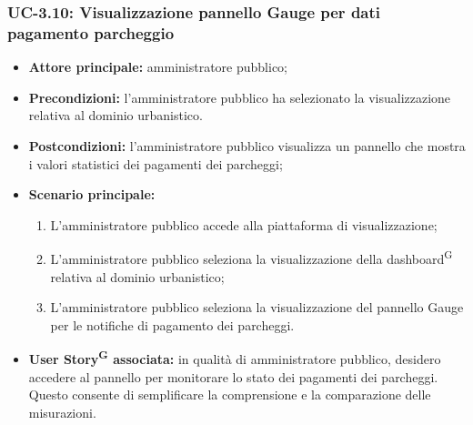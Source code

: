 \documentclass[8pt]{article}
\newcommand{\glossterm}[1]{#1\textsuperscript{G}} %
\begin{document}
\subsubsection*{UC-3.10: Visualizzazione pannello Gauge per dati pagamento parcheggio}
\begin{itemize}
    \item \textbf{Attore principale:} amministratore pubblico;
    \item \textbf{Precondizioni:} l’amministratore pubblico ha selezionato la visualizzazione
        relativa al dominio urbanistico.
    \item \textbf{Postcondizioni:} l'amministratore pubblico visualizza un pannello che mostra i valori statistici dei pagamenti dei parcheggi;
    \item \textbf{Scenario principale:} 
    \begin{enumerate}
    \item L’amministratore pubblico accede alla piattaforma di visualizzazione;
    \item L’amministratore pubblico seleziona la visualizzazione della \glossterm{dashboard} relativa al dominio urbanistico;
    \item L’amministratore pubblico seleziona la visualizzazione del pannello Gauge per le
        notifiche di pagamento dei parcheggi.
    \end{enumerate}
    \item \textbf{\glossterm{User Story} associata:} in qualità di amministratore pubblico, desidero accedere al
        pannello per monitorare lo stato dei pagamenti dei parcheggi. Questo consente di semplificare la comprensione e la comparazione delle misurazioni.
\end{itemize}
\end{document}
